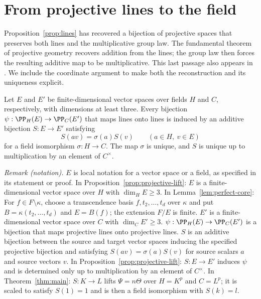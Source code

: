 \section{From projective lines to the field}
\label{sec:fields}

Proposition~\ref{prop:lines} has recovered a bijection of projective
spaces that preserves both lines and the multiplicative group law.
The fundamental theorem of projective geometry
\citep[Section~8.2, Theorem~8.2]{Hall2015} recovers addition from
the lines; the group law then forces the resulting additive map to be
multiplicative. This last passage also appears in
\citet[Section~4, Lemma~29]{CadoretPirutka2021}. We include the coordinate argument
to make both the reconstruction and its uniqueness explicit.

\begin{proposition}\label{prop:projective-lift}
Let $E$ and $E'$ be finite-dimensional vector spaces over fields $H$
and $C$, respectively, with dimensions at least three. Every bijection
$\psi:\PP_H(E)\to\PP_C(E')$ that maps lines onto lines is induced by
an additive bijection $S:E\to E'$ satisfying
\[
 S(av)=\sigma(a)S(v)\qquad(a\in H,\ v\in E)
\]
for a field isomorphism $\sigma:H\to C$. The map $\sigma$ is unique,
and $S$ is unique up to multiplication by an element of $C^\times$.
\end{proposition}

\noindent\textit{Remark (notation).} $E$ is local notation for a vector space or a field, as specified in its statement or proof. In Proposition~\ref{prop:projective-lift}: $E$ is a finite-dimensional vector space over $H$ with $\dim_H E\ge3$. In Lemma~\ref{lem:perfect-core}: For $f\in F\setminus\kappa$, choose a transcendence basis $f,t_2,\ldots,t_d$ over $\kappa$ and put $B=\kappa(t_2,\ldots,t_d)$ and $E=B(f)$; the extension $F/E$ is finite. $E'$ is a finite-dimensional vector space over $C$ with $\dim_C E'\ge3$. $\psi:\PP_H(E)\to\PP_C(E')$ is a bijection that maps projective lines onto projective lines. $S$ is an additive bijection between the source and target vector spaces inducing the specified projective bijection and satisfying $S(av)=\sigma(a)S(v)$ for source scalars $a$ and source vectors $v$. In Proposition~\ref{prop:projective-lift}: $S:E\to E'$ induces $\psi$ and is determined only up to multiplication by an element of $C^\times$. In Theorem~\ref{thm:main}: $S:K\to L$ lifts $\Psi=n\Theta$ over $H=K^p$ and $C=L^p$; it is scaled to satisfy $S(1)=1$ and is then a field isomorphism with $S(k)=l$.


